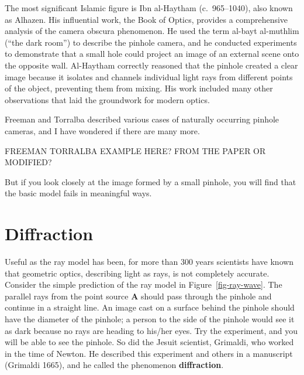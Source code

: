 \documentclass[
  letterpaper,
]{book}
\begin{document}
The most significant Islamic figure is Ibn al-Haytham (c.~965--1040),
also known as Alhazen. His influential work, the Book of Optics,
provides a comprehensive analysis of the camera obscura phenomenon. He
used the term al-bayt al-muthlim (``the dark room'') to describe the
pinhole camera, and he conducted experiments to demonstrate that a small
hole could project an image of an external scene onto the opposite wall.
Al-Haytham correctly reasoned that the pinhole created a clear image
because it isolates and channels individual light rays from different
points of the object, preventing them from mixing. His work included
many other observations that laid the groundwork for modern optics.

Freeman and Torralba described various cases of naturally occurring
pinhole cameras, and I have wondered if there are many more.

FREEMAN TORRALBA EXAMPLE HERE? FROM THE PAPER OR MODIFIED?

But if you look closely at the image formed by a small pinhole, you will
find that the basic model fails in meaningful ways.

\section{Diffraction}\label{sec-lightfields-diffraction}

Useful as the ray model has been, for more than 300 years scientists
have known that geometric optics, describing light as rays, is not
completely accurate. Consider the simple prediction of the ray model in
Figure~\ref{fig-ray-wave}. The parallel rays from the point source
\textbf{A} should pass through the pinhole and continue in a straight
line. An image cast on a surface behind the pinhole should have the
diameter of the pinhole; a person to the side of the pinhole would see
it as dark because no rays are heading to his/her eyes. Try the
experiment, and you will be able to see the pinhole. So did the Jesuit
scientist, Grimaldi, who worked in the time of Newton. He described this
experiment and others in a manuscript (Grimaldi 1665), and he called the
phenomenon \textbf{diffraction}.
\end{document}
